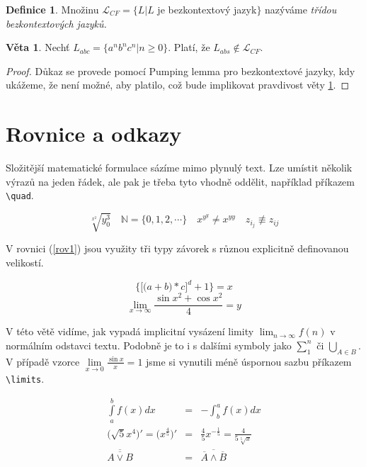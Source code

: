 \documentclass[11pt,a4paper,twocolumn]{article}
\theoremstyle{definition}
\newtheorem{defn}{Definice}[section]
\theoremstyle{lemma}
\newtheorem{sntc}{Věta}
\begin{document}
\begin{defn} 
  \label{defn4}
  Množinu $\mathcal{L}_{CF}=\{L|L$ je bezkontextový jazyk$\}$ nazýváme {\itshape třídou bezkontextových jazyků.}
\end{defn}

\begin{sntc}
  \label{sntc1}
  Nechť $L_{abc}=\{a^nb^nc^n|n\geq 0\}$. Platí, že $L_{abs}\notin \mathcal{L}_{CF}$.
\end{sntc}

\begin{proof} 
  \label{proof}
  Důkaz se provede pomocí Pumping lemma pro bezkontextové jazyky, kdy ukážeme, že není možné, aby
  platilo, což bude implikovat pravdivost věty \ref{sntc1}.
\end{proof}

\section{Rovnice a odkazy}
\label{rovniceaodkazy}

\noindent Složitější matematické formulace sázíme mimo plynulý text. Lze umístit několik výrazů
na jeden řádek, ale pak je třeba tyto vhodně oddělit, například příkazem \verb|\quad|.

$$\sqrt[x^2]{y^3_0} \quad \mathbb{N} =\{0, 1, 2,\cdots\}\quad x^{y^y} \not =x^{yy} \quad z_{i_j}
\not\equiv z_{ij}$$

\indent V rovnici (\ref{rov1}) jsou využity tři typy závorek s různou explicitně definovanou velikostí.

\begin{equation}\label{rov1}
 \bigg\{\Big[\big(a+b\big)*c\Big]^d+1\bigg\}=x 
\end{equation}
$$\lim_{x\to \infty} \frac{\sin{x}^2+\cos{x}^2}{4} = y$$

\indent V této větě vidíme, jak vypadá implicitní vysázení limity $\lim_{n\to \infty}f(n)$ v
normálním odstavci textu. Podobně je to i s dalšími symboly jako $\sum_1^n$ či
$\bigcup_{A\in B}$. V případě vzorce $\lim\limits _{x\to 0} \frac{\sin{x}}{x}\!=\!1$ jsme si vynutili méně úspornou
sazbu příkazem \verb|\limits|.

\begin{eqnarray}
  \int\limits_{a}^{b} f(x)dx & = & -\int_b^a f(x)dx \\
  \Big(\sqrt{5}{x^4}\Big)' = \Big(x^\frac{4}{5}\Big)' & = & \frac{4}{5}x^{-\frac{1}{5}} =
  \frac{4}{5\sqrt[5]{x}} \\
  \overline{\overline{A \lor B}} & = & \overline{\overline{A}\land\overline{B}}
\end{eqnarray}
\end{document}
